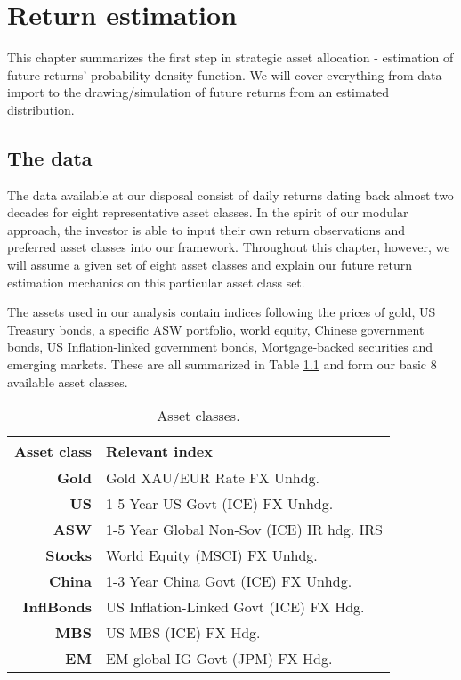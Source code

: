 \chapter{Return estimation}

This chapter summarizes the first step in strategic asset allocation - estimation of future returns' probability density function. We will cover everything from data import to the drawing/simulation of future returns from an estimated distribution.

\section{The data}

The data available at our disposal consist of daily returns dating back almost two decades for eight representative asset classes. In the spirit of our modular approach, the investor is able to input their own return observations and preferred asset classes into our framework. Throughout this chapter, however, we will assume a given set of eight asset classes and explain our future return estimation mechanics on this particular asset class set.

The assets used in our analysis contain indices following the prices of gold, US Treasury bonds, a specific ASW portfolio, world equity, Chinese government bonds, US Inflation-linked government bonds, Mortgage-backed securities and emerging markets. These are all summarized in Table \ref{tab:return_estimation:asset_classes} and form our basic 8 available asset classes.
\begin{table}[h]
	\centering
	\begin{tabularx}{0.9\linewidth}{rX}
		Asset class & Relevant index\\
		\toprule
		\textbf{Gold} & Gold XAU/EUR Rate FX Unhdg.
		 \\
		\textbf{US} & 1-5 Year US Govt (ICE) FX Unhdg.
		 \\
		\textbf{ASW} & 1-5 Year Global Non-Sov (ICE) IR hdg. IRS
		 \\
		\textbf{Stocks} & World Equity (MSCI) FX Unhdg.
		\\
		\textbf{China} & 1-3 Year China Govt (ICE) FX Unhdg.
		\\
		\textbf{InflBonds} & US Inflation-Linked Govt (ICE) FX Hdg.
		\\
		\textbf{MBS} & US MBS (ICE) FX Hdg.
		 \\
		\textbf{EM} & EM global IG Govt (JPM) FX Hdg.
		 \\
		
		\bottomrule
	\end{tabularx}
	\caption{Asset classes.}
	\label{tab:return_estimation:asset_classes}
\end{table}


